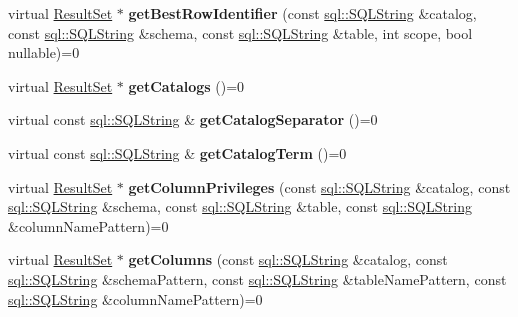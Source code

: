 \begin{DoxyCompactItemize}
virtual \hyperlink{classsql_1_1_result_set}{Result\+Set} $\ast$ {\bfseries get\+Best\+Row\+Identifier} (const \hyperlink{classsql_1_1_s_q_l_string}{sql\+::\+S\+Q\+L\+String} \&catalog, const \hyperlink{classsql_1_1_s_q_l_string}{sql\+::\+S\+Q\+L\+String} \&schema, const \hyperlink{classsql_1_1_s_q_l_string}{sql\+::\+S\+Q\+L\+String} \&table, int scope, bool nullable)=0
\item 
\hypertarget{classsql_1_1_database_meta_data_a5ca54dbc2f5dae656544e77f71312036}{}\label{classsql_1_1_database_meta_data_a5ca54dbc2f5dae656544e77f71312036} 
virtual \hyperlink{classsql_1_1_result_set}{Result\+Set} $\ast$ {\bfseries get\+Catalogs} ()=0
\item 
\hypertarget{classsql_1_1_database_meta_data_a191861504f93a4619c2dc0cffa4b17e7}{}\label{classsql_1_1_database_meta_data_a191861504f93a4619c2dc0cffa4b17e7} 
virtual const \hyperlink{classsql_1_1_s_q_l_string}{sql\+::\+S\+Q\+L\+String} \& {\bfseries get\+Catalog\+Separator} ()=0
\item 
\hypertarget{classsql_1_1_database_meta_data_a8a69bb04c9251af8fc6aa704434f39f1}{}\label{classsql_1_1_database_meta_data_a8a69bb04c9251af8fc6aa704434f39f1} 
virtual const \hyperlink{classsql_1_1_s_q_l_string}{sql\+::\+S\+Q\+L\+String} \& {\bfseries get\+Catalog\+Term} ()=0
\item 
\hypertarget{classsql_1_1_database_meta_data_ae5846ef8fe9f6898d0d5d4c621b6480d}{}\label{classsql_1_1_database_meta_data_ae5846ef8fe9f6898d0d5d4c621b6480d} 
virtual \hyperlink{classsql_1_1_result_set}{Result\+Set} $\ast$ {\bfseries get\+Column\+Privileges} (const \hyperlink{classsql_1_1_s_q_l_string}{sql\+::\+S\+Q\+L\+String} \&catalog, const \hyperlink{classsql_1_1_s_q_l_string}{sql\+::\+S\+Q\+L\+String} \&schema, const \hyperlink{classsql_1_1_s_q_l_string}{sql\+::\+S\+Q\+L\+String} \&table, const \hyperlink{classsql_1_1_s_q_l_string}{sql\+::\+S\+Q\+L\+String} \&column\+Name\+Pattern)=0
\item 
\hypertarget{classsql_1_1_database_meta_data_a6335f2fdd25a724510fdcea2117f8df7}{}\label{classsql_1_1_database_meta_data_a6335f2fdd25a724510fdcea2117f8df7} 
virtual \hyperlink{classsql_1_1_result_set}{Result\+Set} $\ast$ {\bfseries get\+Columns} (const \hyperlink{classsql_1_1_s_q_l_string}{sql\+::\+S\+Q\+L\+String} \&catalog, const \hyperlink{classsql_1_1_s_q_l_string}{sql\+::\+S\+Q\+L\+String} \&schema\+Pattern, const \hyperlink{classsql_1_1_s_q_l_string}{sql\+::\+S\+Q\+L\+String} \&table\+Name\+Pattern, const \hyperlink{classsql_1_1_s_q_l_string}{sql\+::\+S\+Q\+L\+String} \&column\+Name\+Pattern)=0

\end{DoxyCompactItemize}
